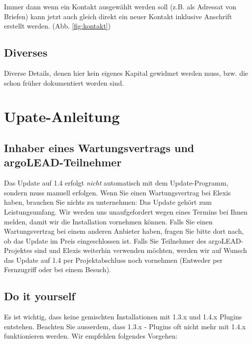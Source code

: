 \documentclass[a4paper]{scrartcl}
\begin{document}
Immer dann wenn ein Kontakt ausgewählt werden soll (z.B. als Adressat von Briefen) kann jetzt auch gleich direkt ein neuer Kontakt inklusive Anschrift erstellt werden. (Abb. \ref{fig:kontakt})

\subsection{Diverses}
Diverse Details, denen hier kein eigenes Kapital gewidmet werden muss, bzw. die schon früher dokumentiert worden sind.

\section{Upate-Anleitung}
\label{update}
\subsection{Inhaber eines Wartungsvertrags und argoLEAD-Teilnehmer}
Das Update auf 1.4 erfolgt \textit{nicht} automatisch mit dem Update-Programm, sondern muss manuell erfolgen. Wenn Sie einen Wartungsvertrag bei Elexis haben, brauchen Sie nichts zu unternehmen: Das Update gehört zum Leistungsumfang. Wir werden uns unaufgefordert wegen eines Termins bei Ihnen melden, damit wir die Installation vornehmen können. Falls Sie einen Wartungsvertrag bei einem anderen Anbieter haben, fragen Sie bitte dort nach, ob das Update im Preis eingeschlossen ist. Falls Sie Teilnehmer des argoLEAD-Projektes sind und Elexis weiterhin verwenden möchten, werden wir auf Wunsch das Update auf 1.4 per Projektabschluss noch vornehmen (Entweder per Fernzugriff oder bei einem Besuch).

\subsection{Do it yourself}
Es ist wichtig, dass keine gemischten Installationen mit 1.3.x und 1.4.x Plugins entstehen. Beachten Sie ausserdem, dass 1.3.x - Plugins oft nicht mehr mit 1.4.x funktionieren werden. Wir empfehlen folgendes Vorgehen:
\end{document}

